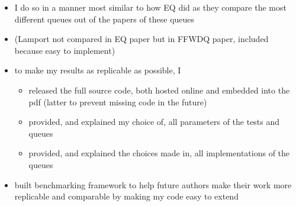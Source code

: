 \begin{itemize}
    \item I do so in a manner most similar to how EQ did as they compare the most different
        queues out of the papers of these queues
    \item (Lamport not compared in EQ paper but in FFWDQ paper, included because easy to implement)
    \item to make my results as replicable as possible, I
        \begin{itemize}
            \item released the full source code, both hosted online and embedded into the pdf
                (latter to prevent missing code in the future)
            \item provided, and explained my choice of, all parameters of the tests and queues
            \item provided, and explained the choices made in, all implementations of the queues
        \end{itemize}
    \item built benchmarking framework to help future authors make their work more replicable and comparable
        by making my code easy to extend
\end{itemize}

